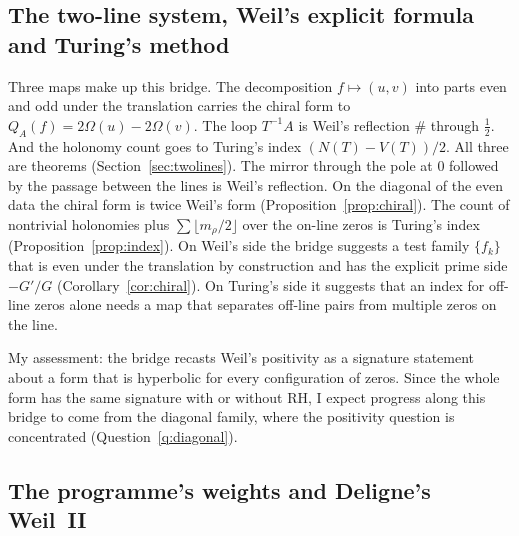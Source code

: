 \subsection{The two-line system, Weil's explicit formula and Turing's method}

Three maps make up this bridge. The decomposition $f\mapsto(u,v)$ into parts even and odd under the translation carries the chiral form to $Q_A(f)=2\Omega(u)-2\Omega(v)$. The loop $T^{-1}A$ is Weil's reflection $\#$ through $\tfrac12$. And the holonomy count goes to Turing's index $(N(T)-V(T))/2$.
All three are theorems (Section~\ref{sec:twolines}). The mirror through the pole at $0$ followed by the passage between the lines is Weil's reflection. On the diagonal of the even data the chiral form is twice Weil's form (Proposition~\ref{prop:chiral}). The count of nontrivial holonomies plus $\sum\lfloor m_\rho/2\rfloor$ over the on-line zeros is Turing's index (Proposition~\ref{prop:index}).
On Weil's side the bridge suggests a test family $\{f_k\}$ that is even under the translation by construction and has the explicit prime side $-G'/G$ (Corollary~\ref{cor:chiral}). On Turing's side it suggests that an index for off-line zeros alone needs a map that separates off-line pairs from multiple zeros on the line.

My assessment: the bridge recasts Weil's positivity as a signature statement about a form that is hyperbolic for every configuration of zeros. Since the whole form has the same signature with or without RH, I expect progress along this bridge to come from the diagonal family, where the positivity question is concentrated (Question~\ref{q:diagonal}).

\subsection{The programme's weights and Deligne's Weil~II}

